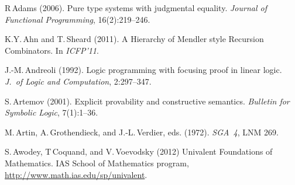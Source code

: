 \documentclass[11pt,twocolumn]{article}
\begin{document}
{\footnotesize
\begin{thebibliography}{000}


R\,Adams (2006).
\newblock Pure type systems with judgmental equality.
\newblock \emph{Journal of Functional Programming}, 16(2):219--246.

K.Y.\,Ahn and T.\,Sheard (2011).
\newblock A Hierarchy of Mendler style Recursion Combinators. 
\newblock In \emph{ICFP'11}.  



J.-M.\,Andreoli (1992).
\newblock Logic programming with focusing proof in linear logic.
\newblock \emph{J.\ of Logic and Computation}, 2:297--347.

S.\,Artemov (2001).
\newblock Explicit provability and constructive semantics.
\newblock \emph{Bulletin for Symbolic Logic}, 7(1):1--36.


M.\,Artin, A.\,Grothendieck, and J.-L.\,Verdier, eds. (1972).
\newblock \emph{SGA~4}, LNM 269. 

S.\,Awodey, T\,Coquand, and V.\,Voevodsky (2012)
\newblock Univalent Foundations of Mathematics.
\newblock IAS School of Mathematics program,
\url{http://www.math.ias.edu/sp/univalent}.  



\end{thebibliography}}
\end{document}
